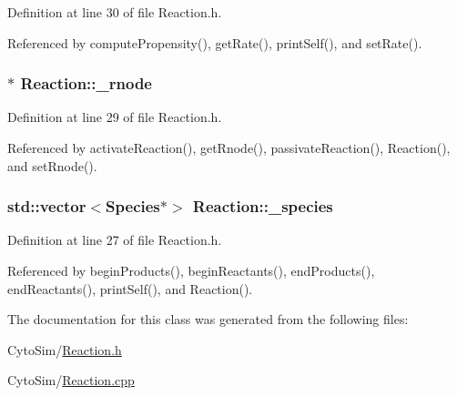 Definition at line 30 of file Reaction.\-h.



Referenced by compute\-Propensity(), get\-Rate(), print\-Self(), and set\-Rate().

\hypertarget{classReaction_aac601de06243ef48562af10998769954}{
\subsubsection[{\-\_\-rnode}]{$\ast$ {\bf Reaction\-::\-\_\-rnode}}}\label{classReaction_aac601de06243ef48562af10998769954}


Definition at line 29 of file Reaction.\-h.



Referenced by activate\-Reaction(), get\-Rnode(), passivate\-Reaction(), Reaction(), and set\-Rnode().

\hypertarget{classReaction_aad2be5bf52ae2b229ddd91a8577421ba}{
\subsubsection[{\-\_\-species}]{\setlength{\rightskip}{0pt plus 5cm}std\-::vector$<${\bf Species}$\ast$$>$ {\bf Reaction\-::\-\_\-species}}}\label{classReaction_aad2be5bf52ae2b229ddd91a8577421ba}


Definition at line 27 of file Reaction.\-h.



Referenced by begin\-Products(), begin\-Reactants(), end\-Products(), end\-Reactants(), print\-Self(), and Reaction().



The documentation for this class was generated from the following files\-:\begin{DoxyCompactItemize}
\item 
Cyto\-Sim/\hyperlink{Reaction_8h}{Reaction.\-h}\item 
Cyto\-Sim/\hyperlink{Reaction_8cpp}{Reaction.\-cpp}\end{DoxyCompactItemize}
